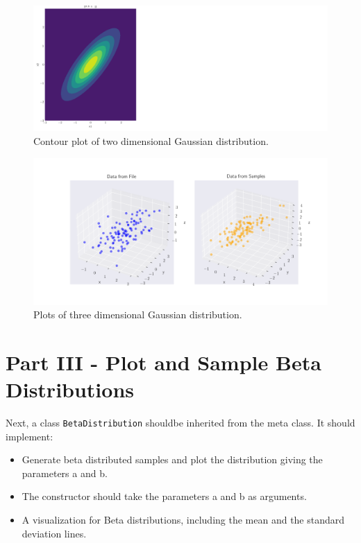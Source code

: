 \documentclass{CPSReport}
\begin{document}
\begin{figure}[ht]
    \begin{center}
        \includegraphics[width=1\linewidth]{../gaussian2D_contour.png}
    \end{center}
    \caption{Contour plot of two dimensional Gaussian distribution.}
    \label{fig:3}
\end{figure}

\begin{figure}[ht]
    \begin{center}
        \includegraphics[width=1\linewidth]{../gaussian3D.png}
    \end{center}
    \caption{Plots of three dimensional Gaussian distribution.}
    \label{fig:4}
\end{figure}

\section{Part III - Plot and Sample Beta Distributions}
Next, a class \texttt{BetaDistribution} shouldbe inherited from the meta class. It should implement:

\begin{itemize}
    \item Generate beta distributed samples and plot the distribution giving the parameters a and b.
    \item The constructor should take the parameters a and b as arguments.
    \item A visualization for Beta distributions, including the mean and the standard deviation lines.
\end{itemize}
\end{document}
